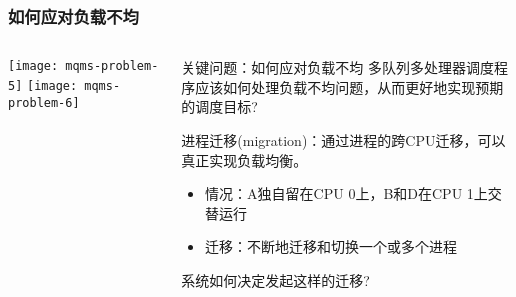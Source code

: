 \begin{frame}
	\frametitle{如何应对负载不均}
	\begin{columns}
		\begin{column}{.5\textwidth}
			\Large \centering
			\texttt{[image: mqms-problem-5]}
			\texttt{[image: mqms-problem-6]}	
		\end{column}
		
		\begin{column}{.5\textwidth}
			\begin{block}{关键问题：如何应对负载不均}
			多队列多处理器调度程序应该如何处理负载不均问题，从而更好地实现预期的调度目标?
			\end{block} 
			\normalsize
			进程迁移(migration)：通过进程的跨CPU迁移，可以真正实现负载均衡。 
			
			\begin{itemize}
				\item 情况：A独自留在CPU 0上，B和D在CPU 1上交替运行
				\item 迁移：不断地迁移和切换一个或多个进程

			\end{itemize} \pause
		\large
		系统如何决定发起这样的迁移?
			\Large
			
		\end{column}
	\end{columns}
\end{frame}



